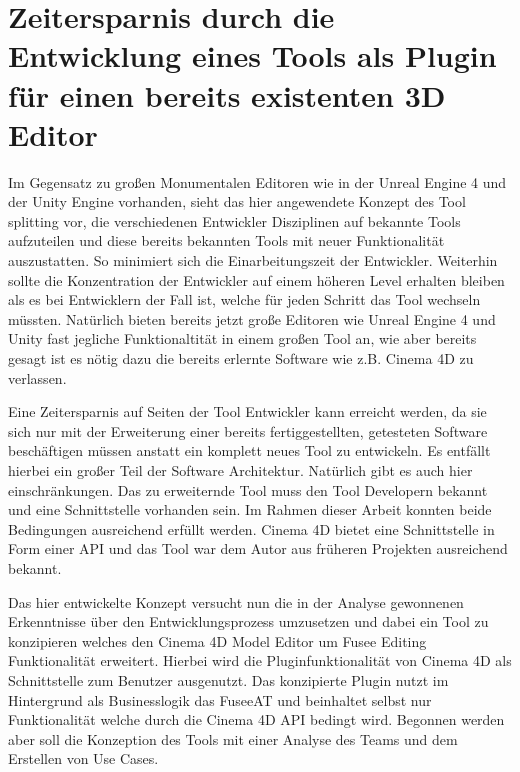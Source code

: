 \documentclass[pagesize, paper=a4, fontsize=12pt, titlepage=true, headings=small, headnosepline, abstractoff, liststotoc, nochapterprefix, plainheadsepline, twoside]{scrreprt}
\begin{document}
\section{Zeitersparnis durch die Entwicklung eines Tools als Plugin für einen bereits existenten 3D Editor}
Im Gegensatz zu großen Monumentalen Editoren wie in der Unreal Engine 4 und der Unity Engine vorhanden, sieht das hier angewendete Konzept des Tool splitting vor, die verschiedenen Entwickler Disziplinen auf bekannte Tools aufzuteilen und diese bereits bekannten Tools mit neuer Funktionalität auszustatten. So minimiert sich die Einarbeitungszeit der Entwickler. Weiterhin sollte die Konzentration der Entwickler auf einem höheren Level erhalten bleiben als es bei Entwicklern der Fall ist, welche für jeden Schritt das Tool wechseln müssten. Natürlich bieten bereits jetzt große Editoren wie Unreal Engine 4 und Unity fast jegliche Funktionaltität in einem großen Tool an, wie aber bereits gesagt ist es nötig dazu die bereits erlernte Software wie z.B. Cinema 4D zu verlassen.

Eine Zeitersparnis auf Seiten der Tool Entwickler kann erreicht werden, da sie sich nur mit der Erweiterung einer bereits fertiggestellten, getesteten Software beschäftigen müssen anstatt ein komplett neues Tool zu entwickeln. Es entfällt hierbei ein großer Teil der Software Architektur. Natürlich gibt es auch hier einschränkungen. Das zu erweiternde Tool muss den Tool Developern bekannt und eine Schnittstelle vorhanden sein. Im Rahmen dieser Arbeit konnten beide Bedingungen ausreichend erfüllt werden. Cinema 4D bietet eine Schnittstelle in Form einer API und das Tool war dem Autor aus früheren Projekten ausreichend bekannt.

Das hier entwickelte Konzept versucht nun die in der Analyse gewonnenen Erkenntnisse über den Entwicklungsprozess umzusetzen und dabei ein Tool zu konzipieren welches den Cinema 4D Model Editor um Fusee Editing Funktionalität erweitert. Hierbei wird die Pluginfunktionalität von Cinema 4D als Schnittstelle zum Benutzer ausgenutzt. Das konzipierte Plugin nutzt im Hintergrund als Businesslogik das FuseeAT und beinhaltet selbst nur Funktionalität welche durch die Cinema 4D API bedingt wird. Begonnen werden aber soll die Konzeption des Tools mit einer Analyse des Teams und dem Erstellen von Use Cases.

\end{document}
